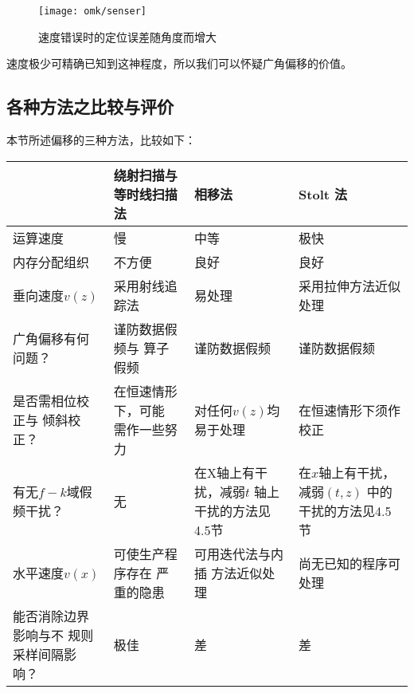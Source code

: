 \begin{figure}[H]
\centering
\texttt{[image: omk/senser]}
\caption[senser]{速度错误时的定位误差随角度而增大}
\label{fig:omk/senser}
\end{figure}

速度极少可精确已知到这神程度，所以我们可以怀疑广角偏移的价值。
\subsection{各种方法之比较与评价 }
本节所述偏移的三种方法，比较如下：
\begin{table}[!ht]
\centering
\ttfamily
\small
\begin{tabularx}{\textwidth}{Y|Y|Y|Y}
\hline 
 & 绕射扫描与等时线扫描法 & 相移法 & Stolt 法\\
\hline
运算速度 &慢 & 中等 & 极快\\ \hline
内存分配组织 & 不方便 & 良好 & 良好\\ \hline
垂向速度$v(z)$ & 采用射线追踪法& 易处理 & 采用拉伸方法近似处理\\ \hline
广角偏移有何问题？ & 谨防数据假频与
					算子假频
 & 谨防数据假频 & 谨防数据假颏\\ \hline
是否需相位校正与
倾斜校正？
 & 在恒速情形下，可能
需作一些努力
 & 对任何$v(z)$均易于处理 &
在恒速情形下须作校正\\ \hline
有无$f-k$域假频干扰？ & 无 & 在X轴上有干扰，减弱$t$
轴上干扰的方法见4.5节 &
在$x$轴上有干扰，减弱$(t,z)$
中的干扰的方法见4.5节\\ \hline
水平速度$v(x)$
 & 可使生产程序存在
严重的隐患
 & 可用迭代法与内插
方法近似处理 &
尚无已知的程序可处理\\ \hline
能否消除边界影响与不
规则采样间隔影响？ & 极佳 & 差 & 差\\ \hline
\end{tabularx}
\end{table}

